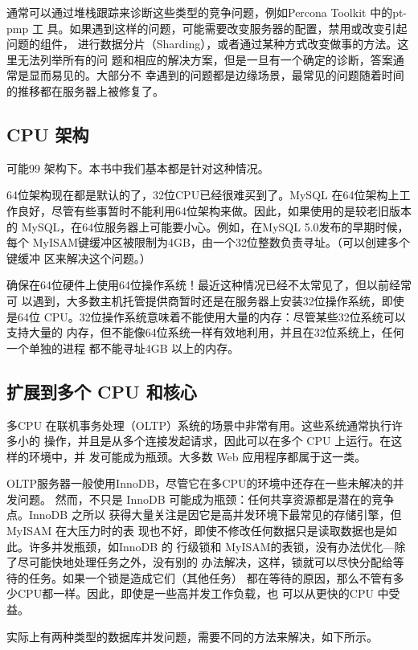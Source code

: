 通常可以通过堆栈跟踪来诊断这些类型的竞争问题，例如Percona Toolkit 中的pt-pmp 工
具。如果遇到这样的问题，可能需要改变服务器的配置，禁用或改变引起问题的组件，
进行数据分片（Sharding），或者通过某种方式改变做事的方法。这里无法列举所有的问
题和相应的解决方案，但是一旦有一个确定的诊断，答案通常是显而易见的。大部分不
幸遇到的问题都是边缘场景，最常见的问题随着时间的推移都在服务器上被修复了。

\subsection{CPU 架构}
可能99%
架构下。本书中我们基本都是针对这种情况。

64位架构现在都是默认的了，32位CPU已经很难买到了。MySQL 在64位架构上工
作良好，尽管有些事暂时不能利用64位架构来做。因此，如果使用的是较老旧版本的
MySQL，在64位服务器上可能要小心。例如，在MySQL 5.0发布的早期时候，每个
MyISAM键缓冲区被限制为4GB，由一个32位整数负责寻址。（可以创建多个键缓冲
区来解决这个问题。）

确保在64位硬件上使用64位操作系统！最近这种情况已经不太常见了，但以前经常可
以遇到，大多数主机托管提供商暂时还是在服务器上安装32位操作系统，即使是64位
CPU。32位操作系统意味着不能使用大量的内存：尽管某些32位系统可以支持大量的
内存，但不能像64位系统一样有效地利用，并且在32位系统上，任何一个单独的进程
都不能寻址4GB 以上的内存。

\subsection{扩展到多个 CPU 和核心}
多CPU 在联机事务处理（OLTP）系统的场景中非常有用。这些系统通常执行许多小的
操作，并且是从多个连接发起请求，因此可以在多个 CPU 上运行。在这样的环境中，并
发可能成为瓶颈。大多数 Web 应用程序都属于这一类。

OLTP服务器一般使用InnoDB，尽管它在多CPU的环境中还存在一些未解决的并发问题。
然而，不只是 InnoDB 可能成为瓶颈：任何共享资源都是潜在的竞争点。InnoDB 之所以
获得大量关注是因它是高并发环境下最常见的存储引擎，但MyISAM 在大压力时的表
现也不好，即使不修改任何数据只是读取数据也是如此。许多并发瓶颈，如InnoDB 的
行级锁和 MyISAM的表锁，没有办法优化—除了尽可能快地处理任务之外，没有别的
办法解决，这样，锁就可以尽快分配给等待的任务。如果一个锁是造成它们（其他任务）
都在等待的原因，那么不管有多少CPU都一样。因此，即使是一些高并发工作负载，也
可以从更快的CPU 中受益。

实际上有两种类型的数据库并发问题，需要不同的方法来解决，如下所示。

